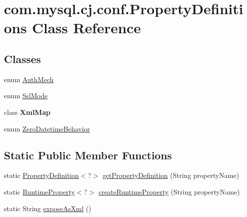 \hypertarget{classcom_1_1mysql_1_1cj_1_1conf_1_1_property_definitions}{}\section{com.\+mysql.\+cj.\+conf.\+Property\+Definitions Class Reference}
\label{classcom_1_1mysql_1_1cj_1_1conf_1_1_property_definitions}
\subsection*{Classes}
\begin{DoxyCompactItemize}
\item 
enum \mbox{\hyperlink{enumcom_1_1mysql_1_1cj_1_1conf_1_1_property_definitions_1_1_auth_mech}{Auth\+Mech}}
\item 
enum \mbox{\hyperlink{enumcom_1_1mysql_1_1cj_1_1conf_1_1_property_definitions_1_1_ssl_mode}{Ssl\+Mode}}
\item 
class {\bfseries Xml\+Map}
\item 
enum \mbox{\hyperlink{enumcom_1_1mysql_1_1cj_1_1conf_1_1_property_definitions_1_1_zero_datetime_behavior}{Zero\+Datetime\+Behavior}}
\end{DoxyCompactItemize}
\subsection*{Static Public Member Functions}
\begin{DoxyCompactItemize}
\item 
static \mbox{\hyperlink{interfacecom_1_1mysql_1_1cj_1_1conf_1_1_property_definition}{Property\+Definition}}$<$?$>$ \mbox{\hyperlink{classcom_1_1mysql_1_1cj_1_1conf_1_1_property_definitions_afd49a84fa2e960cf885e7925aa9d0157}{get\+Property\+Definition}} (String property\+Name)
\item 
static \mbox{\hyperlink{interfacecom_1_1mysql_1_1cj_1_1conf_1_1_runtime_property}{Runtime\+Property}}$<$?$>$ \mbox{\hyperlink{classcom_1_1mysql_1_1cj_1_1conf_1_1_property_definitions_aae888406fd8c1443f194fba0e46f371a}{create\+Runtime\+Property}} (String property\+Name)
\item 
static String \mbox{\hyperlink{classcom_1_1mysql_1_1cj_1_1conf_1_1_property_definitions_a2813d1ea118b8aae2ca6dd7933edba5d}{expose\+As\+Xml}} ()
\end{DoxyCompactItemize}
